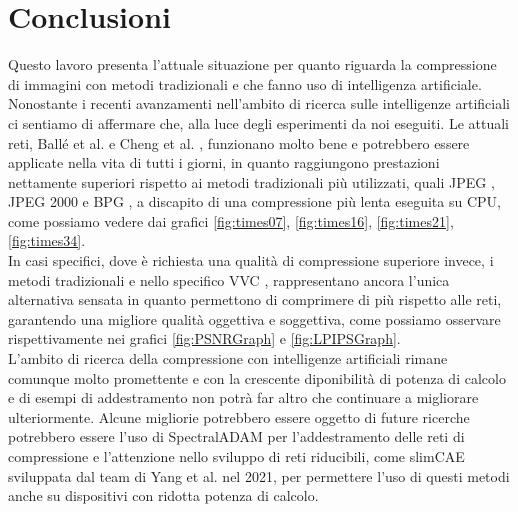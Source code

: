 \chapter{Conclusioni}
Questo lavoro presenta l’attuale situazione per quanto riguarda la compressione di immagini con metodi tradizionali e che fanno uso di intelligenza artificiale. Nonostante i recenti avanzamenti nell’ambito di ricerca sulle intelligenze artificiali ci sentiamo di affermare che, alla luce degli esperimenti da noi eseguiti. Le attuali reti, Ballé et al. \cite{minnen2018joint} e Cheng et al. \cite{cheng2020learned}, funzionano molto bene e potrebbero essere applicate nella vita di tutti i giorni, in quanto raggiungono prestazioni nettamente superiori rispetto ai metodi tradizionali più utilizzati, quali JPEG \cite{125072}, JPEG 2000 \cite{952804} e BPG \cite{BPGImageformat}, a discapito di una compressione più lenta eseguita su CPU, come possiamo vedere dai grafici \ref{fig:times07}, \ref{fig:times16}, \ref{fig:times21}, \ref{fig:times34}.\\
In casi specifici, dove è richiesta una qualità di compressione superiore invece, i metodi tradizionali e nello specifico VVC \cite{9503377}, rappresentano ancora l’unica alternativa sensata in quanto permettono di comprimere di più rispetto alle reti, garantendo una migliore qualità oggettiva e soggettiva, come possiamo osservare rispettivamente nei grafici \ref{fig:PSNRGraph} e \ref{fig:LPIPSGraph}.\\
L’ambito di ricerca della compressione con intelligenze artificiali rimane comunque molto promettente e con la crescente diponibilità di potenza di calcolo e di esempi di addestramento non potrà far altro che continuare a migliorare ulteriormente. Alcune migliorie potrebbero essere oggetto di future ricerche potrebbero essere l’uso di SpectralADAM \cite{balle2018efficient} per l’addestramento delle reti di compressione e l’attenzione nello sviluppo di reti riducibili, come slimCAE \cite{yang2021slimmable} sviluppata dal team di Yang et al. nel 2021, per permettere l’uso di questi metodi anche su dispositivi con ridotta potenza di calcolo.\\
